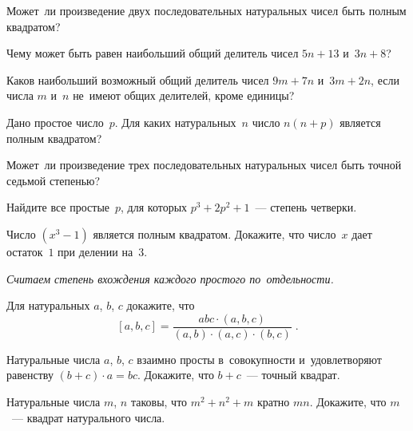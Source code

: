 


\begin{problems}

Может~ли произведение двух последовательных натуральных чисел быть полным
квадратом?

\item
Чему может быть равен наибольший общий делитель чисел $5 n + 13$ и~$3 n + 8$?

\item
Каков наибольший возможный общий делитель чисел $9 m + 7 n$ и~$3 m + 2 n$,
если числа $m$ и~$n$ не~имеют общих делителей, кроме единицы?

\item
Дано простое число~$p$.
Для каких натуральных~$n$ число $n (n + p)$ является полным квадратом?

\item
Может~ли произведение трех последовательных натуральных чисел быть точной
седьмой степенью?

\item
Найдите все простые~$p$, для которых $p^3 + 2 p^2 + 1$~--- степень четверки.

\item
Число $(x^3 - 1)$ является полным квадратом.
Докажите, что число~$x$ дает остаток~$1$ при делении на~$3$.

\end{problems}

\emph{Считаем степень вхождения каждого простого по~отдельности.}

\begin{problems}

\item
Для натуральных $a$, $b$, $c$ докажите, что
\[
    [a, b, c]
=
    \frac{a b c \cdot (a, b, c)}{(a, b) \cdot (a, c) \cdot (b, c)}
\; . \]

\item
Натуральные числа $a$, $b$, $c$ взаимно просты в~совокупности и~удовлетворяют
равенству $(b + c) \cdot a = b c$.
Докажите, что $b + c$~--- точный квадрат.

\item
Натуральные числа $m$, $n$ таковы, что $m^2 + n^2 + m$ кратно $m n$.
Докажите, что $m$~--- квадрат натурального числа.

\end{problems}


